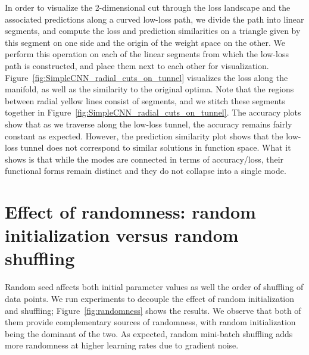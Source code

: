 \documentclass{article}
\begin{document}
%
In order to visualize the 2-dimensional cut through the loss landscape and the associated predictions along a curved low-loss path, we divide the path into linear segments, and compute the loss and prediction similarities on a triangle given by this segment on one side and the origin of the weight space on the other. We perform this operation on each of the linear segments from which the low-loss path is constructed, and place them next to each other for visualization. Figure~\ref{fig:SimpleCNN_radial_cuts_on_tunnel} visualizes the loss along the manifold, as well as the similarity to the original optima.  Note that the regions between radial yellow lines consist of segments, and we stitch these segments  together in Figure~\ref{fig:SimpleCNN_radial_cuts_on_tunnel}. 
%
{The accuracy plots show that as we traverse along the low-loss tunnel, the accuracy remains fairly constant as expected. However, the prediction similarity plot shows that the low-loss tunnel does not correspond to similar solutions in function space. 
%
What it shows is that while the modes are connected in terms of accuracy/loss, their functional forms remain distinct and they do not collapse into a single mode.}




  


%
%
%
%
%
%
%
%




%

 



%
%
%
%
%
%
%


%
%

%
%
%




%

%
%
 
 
\section{Effect of randomness: random initialization versus random shuffling}\label{sec:randomness}
%
%
Random seed affects both initial parameter values as well the order of shuffling of data points. %
We run experiments to decouple the effect of random initialization and shuffling; Figure~\ref{fig:randomness} shows the results. We observe that both of them provide complementary sources of randomness, with random initialization being the dominant of the two. As expected, random mini-batch shuffling adds more randomness at higher learning rates due to gradient noise. 
\end{document}
